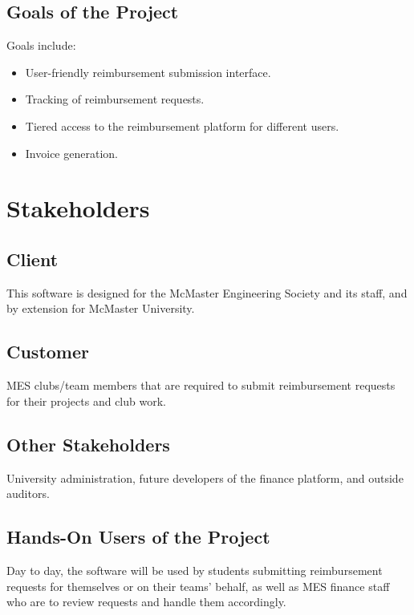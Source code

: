 \documentclass[12pt]{article}
\begin{document}
\subsection{Goals of the Project}
Goals include:
\begin{itemize}
    \item User-friendly reimbursement submission interface.
    \item Tracking of reimbursement requests.
    \item Tiered access to the reimbursement platform for different users.
    \item Invoice generation.
\end{itemize}

\section{Stakeholders}
\subsection{Client}
This software is designed for the McMaster Engineering Society and its staff, and by extension for McMaster University.

\subsection{Customer}
MES clubs/team members that are required to submit reimbursement requests for their projects and club work.

\subsection{Other Stakeholders}
University administration, future developers of the finance platform, and outside auditors.

\subsection{Hands-On Users of the Project}
Day to day, the software will be used by students submitting reimbursement requests for themselves or on their teams' behalf, as well as MES finance staff who are to review requests and handle them accordingly.
\end{document}
